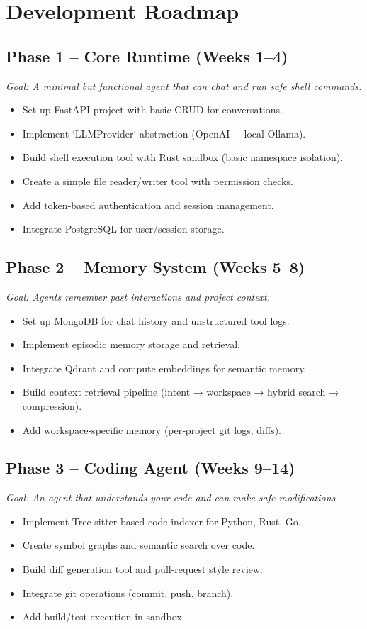 \documentclass[12pt,a4paper]{article}
\begin{document}
\section{Development Roadmap}

\subsection{Phase 1 – Core Runtime (Weeks 1–4)}
\emph{Goal: A minimal but functional agent that can chat and run safe shell commands.}
\begin{itemize}[leftmargin=*]
    \item Set up FastAPI project with basic CRUD for conversations.
    \item Implement `LLMProvider` abstraction (OpenAI + local Ollama).
    \item Build shell execution tool with Rust sandbox (basic namespace isolation).
    \item Create a simple file reader/writer tool with permission checks.
    \item Add token‑based authentication and session management.
    \item Integrate PostgreSQL for user/session storage.
\end{itemize}

\subsection{Phase 2 – Memory System (Weeks 5–8)}
\emph{Goal: Agents remember past interactions and project context.}
\begin{itemize}[leftmargin=*]
    \item Set up MongoDB for chat history and unstructured tool logs.
    \item Implement episodic memory storage and retrieval.
    \item Integrate Qdrant and compute embeddings for semantic memory.
    \item Build context retrieval pipeline (intent → workspace → hybrid search → compression).
    \item Add workspace‑specific memory (per‑project git logs, diffs).
\end{itemize}

\subsection{Phase 3 – Coding Agent (Weeks 9–14)}
\emph{Goal: An agent that understands your code and can make safe modifications.}
\begin{itemize}[leftmargin=*]
    \item Implement Tree‑sitter‑based code indexer for Python, Rust, Go.
    \item Create symbol graphs and semantic search over code.
    \item Build diff generation tool and pull‑request style review.
    \item Integrate git operations (commit, push, branch).
    \item Add build/test execution in sandbox.
\end{itemize}
\end{document}
